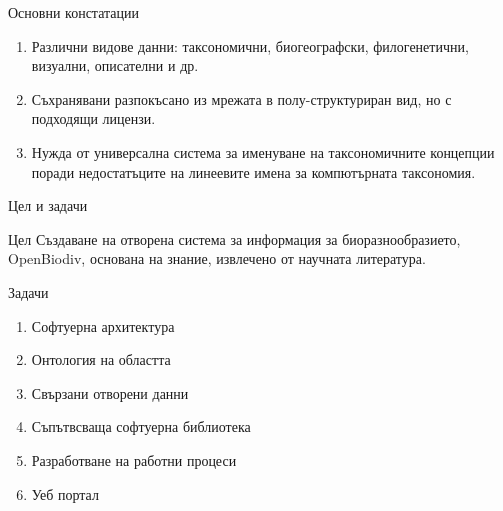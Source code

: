 \documentclass[bulgarian]{beamer}
\begin{document}


{

}




\begin{frame}{Основни констатации}
\begin{enumerate}

\item{Различни видове данни: таксономични, биогеографски, филогенетични, визуални, описателни и др.}

\item{Съхранявани разпокъсано из мрежата в полу-структуриран вид, но с подходящи лицензи.}

\item{Нужда от универсална система за именуване на таксономичните концепции поради недостатъците на линеевите имена за компютърната таксономия.}

\end{enumerate}
\end{frame}



\begin{frame}{Цел и задачи}

\begin{alertblock}{Цел}
Създаване на отворена система за информация за биоразнообразието, OpenBiodiv, основана на знание, извлечено от научната литература.
\end{alertblock}

\begin{block}{Задачи}
\begin{enumerate}

\item{Софтуерна архитектура} 

\item{Онтология на областта}

\item{Свързани отворени данни}

\item{Съпътвсваща софтуерна библиотека}

\item{Разработване на работни процеси}

\item{Уеб портал} 

\end{enumerate}
\end{block}
\end{frame}
\end{document}
